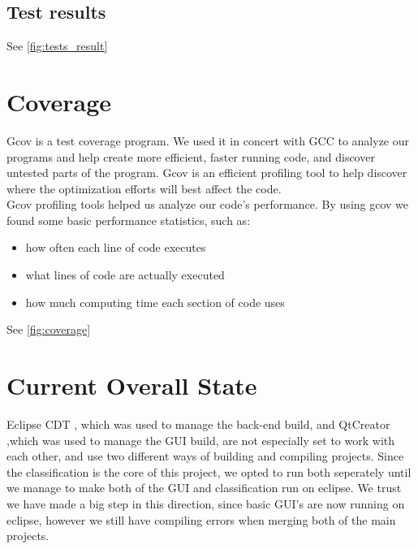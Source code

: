 \documentclass[parskip=full]{scrartcl}
\begin{document}
\pagebreak
\subsection {Test results}
See \ref{fig:tests_result} %


\pagebreak
\section {Coverage}
Gcov is a test coverage program. We used it in concert with GCC to analyze our programs and help create more efficient, faster running code, and discover untested parts of the program. Gcov is an efficient profiling tool to help discover where the optimization efforts will best affect the code.\\
Gcov profiling tools helped us analyze our code's performance. By using gcov we found some basic performance statistics, such as:
\begin{itemize}
	\item how often each line of code executes
	\item what lines of code are actually executed
	\item how much computing time each section of code uses
\end {itemize}


See \ref{fig:coverage}
\pagebreak
\section {Current Overall State}
Eclipse CDT , which was used to manage the back-end build, and QtCreator ,which was used to manage the GUI build, are not especially set to work with each other, and use two different ways of building and compiling projects.
Since the classification is the core of this project, we opted to run both seperately until we manage to make both of the GUI and classification run on eclipse. We trust we have made a big step in this direction, since basic GUI's are now running on eclipse, however we still have compiling errors when merging both of the main projects.
\end{document}
